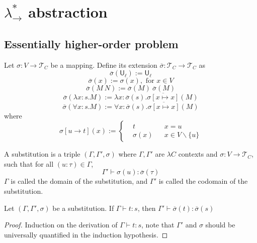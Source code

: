 \section{$\lambda_\to^*$ abstraction}\label{sectabst}

\subsection{Essentially higher-order problem}

\begin{definition} Let $\sigma : V \to \mathcal{T}_C$ be a mapping.
  Define its extension $\overline{\sigma} : \mathcal{T}_C \to \mathcal{T}_C$ as
  $$\overline{\sigma}(\mathsf{U}_\ell) := \mathsf{U}_\ell$$
  $$\overline{\sigma}(x) := \sigma(x), \text{ for }x \in V$$
  $$\overline{\sigma}(M \ N) := \overline{\sigma}(M) \ \overline{\sigma}(M)$$
  $$\overline{\sigma}(\lambda x : s. M) := \lambda x : \overline{\sigma}(s). \overline{\sigma[x \mapsto x]}(M)$$
  $$\overline{\sigma}(\forall x : s. M) := \forall x : \overline{\sigma}(s). \overline{\sigma[x \mapsto x]}(M)$$
  where
  $$\sigma[u \to t](x) := \left\{\begin{aligned}
    & t & & x = u \\
    & \sigma(x) & & x \in V \backslash \{u\}
  \end{aligned}\right.$$
\end{definition}

\begin{definition} A substitution is a triple $(\Gamma, \Gamma', \sigma)$ where $\Gamma, \Gamma'$ are $\lambda C$ contexts
  and $\sigma : V \to \mathcal{T}_C$, such that for all $(u : \tau) \in \Gamma$,
  $$\Gamma' \vdash \sigma(u) : \overline{\sigma}(\tau)$$
  $\Gamma$ is called the domain of the substitution, and $\Gamma'$ is called the codomain of the substitution.
\end{definition}

\begin{theorem}
  Let $(\Gamma, \Gamma', \sigma)$ be a substitution. If $\Gamma \vdash t : s$, then $\Gamma' \vdash \overline{\sigma}(t) : \overline{\sigma}(s)$
\end{theorem}
\begin{proof} Induction on the derivation of $\Gamma \vdash t : s$, note that $\Gamma'$ and $\sigma$
  should be universally quantified in the induction hypothesis.
\end{proof}


